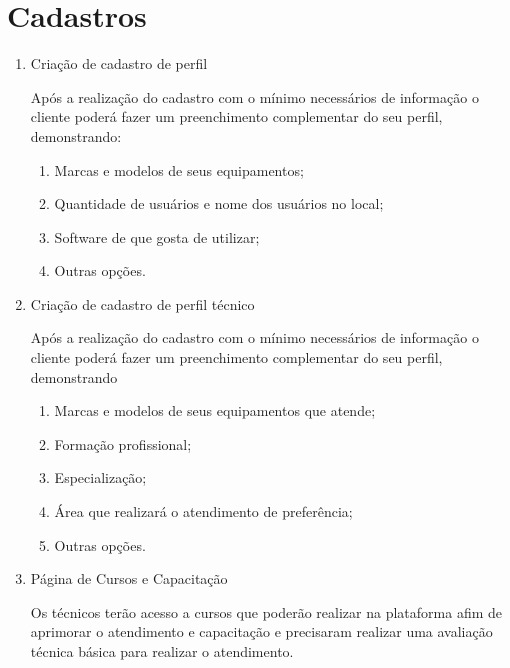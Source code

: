 \documentclass[
    12pt,               %
    openright,          %
    oneside,
    a4paper,            %
    english,            %
    brazil              %
   ]{ifsp-spo-inf-ctds}
\begin{document}
\section{Cadastros}

	\begin{enumerate}
		
		\item 
		Criação de cadastro de perfil
		
		Após a realização do cadastro com o mínimo necessários de informação o cliente poderá fazer um preenchimento complementar do seu perfil, demonstrando:
		
			\begin{enumerate}
				
				\item 
				Marcas e modelos de seus equipamentos;
				
				\item
				Quantidade de usuários e nome dos usuários no local;
				
				\item
				Software de que gosta de utilizar;
				
				\item
				Outras opções.
				
			\end{enumerate}
		
		\item 
		Criação de cadastro de perfil técnico
		
		Após a realização do cadastro com o mínimo necessários de informação o cliente poderá fazer um preenchimento complementar do seu perfil, demonstrando
		
			\begin{enumerate}
				
				\item
				Marcas e modelos de seus equipamentos que atende;
				
				\item
				Formação profissional;
				
				\item
				Especialização;
				
				\item
				Área que realizará o atendimento de preferência;
				
				\item
				Outras opções. 
				
			\end{enumerate}
		
		\item
		Página de Cursos e Capacitação
		
		Os técnicos terão acesso a cursos que poderão realizar na plataforma afim de aprimorar o atendimento e capacitação e precisaram realizar uma avaliação técnica básica para realizar o atendimento.
		
	\end{enumerate}
\end{document}
